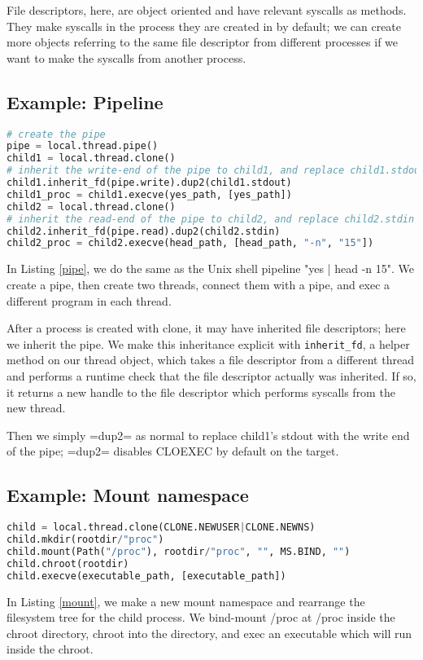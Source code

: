 \documentclass{acmart}
\begin{document}
File descriptors, here, are object oriented and have relevant syscalls as methods.
They make syscalls in the process they are created in by default;
we can create more objects referring to the same file descriptor from different processes
if we want to make the syscalls from another process.
\subsection{Example: Pipeline}
\begin{lstlisting}[float,language=Python,label={pipe},caption={Creating a pipeline}]
# create the pipe
pipe = local.thread.pipe()
child1 = local.thread.clone()
# inherit the write-end of the pipe to child1, and replace child1.stdout with it
child1.inherit_fd(pipe.write).dup2(child1.stdout)
child1_proc = child1.execve(yes_path, [yes_path])
child2 = local.thread.clone()
# inherit the read-end of the pipe to child2, and replace child2.stdin with it
child2.inherit_fd(pipe.read).dup2(child2.stdin)
child2_proc = child2.execve(head_path, [head_path, "-n", "15"])
\end{lstlisting}
In Listing \ref{pipe},
we do the same as the Unix shell pipeline "yes | head -n 15".
We create a pipe,
then create two threads,
connect them with a pipe,
and exec a different program in each thread.

After a process is created with clone,
it may have inherited file descriptors;
here we inherit the pipe.
We make this inheritance explicit with \texttt{inherit\_fd},
a helper method on our thread object,
which takes a file descriptor from a different thread
and performs a runtime check that the file descriptor actually was inherited.
If so, it returns a new handle to the file descriptor which performs syscalls from the new thread.

Then we simply =dup2= as normal to replace child1's stdout with the write end of the pipe;
=dup2= disables CLOEXEC by default on the target.
\subsection{Example: Mount namespace}
\begin{lstlisting}[float,language=Python,label={mount},caption={Mount namespace}]
child = local.thread.clone(CLONE.NEWUSER|CLONE.NEWNS)
child.mkdir(rootdir/"proc")
child.mount(Path("/proc"), rootdir/"proc", "", MS.BIND, "")
child.chroot(rootdir)
child.execve(executable_path, [executable_path])
\end{lstlisting}
In Listing \ref{mount},
we make a new mount namespace and rearrange the filesystem tree for the child process.
We bind-mount /proc at /proc inside the chroot directory,
chroot into the directory,
and exec an executable which will run inside the chroot.
\end{document}
